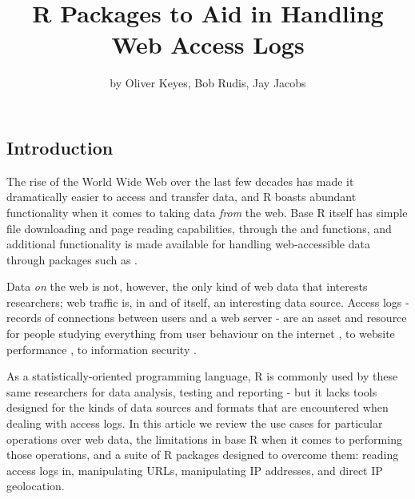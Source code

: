 \title{R Packages to Aid in Handling Web Access Logs}
\author{by Oliver Keyes, Bob Rudis, Jay Jacobs}

\maketitle


\subsection{Introduction}\label{introduction}

The rise of the World Wide Web over the last few decades has made it
dramatically easier to access and transfer data, and R \citep{RCore}
boasts abundant functionality when it comes to taking data \emph{from}
the web. Base R itself has simple file downloading and page reading
capabilities, through the  and 
functions, and additional functionality is made available for handling
web-accessible data through packages such as 
\citep{httr}.

Data \emph{on} the web is not, however, the only kind of web data that
interests researchers; web traffic is, in and of itself, an interesting
data source. Access logs - records of connections between users and a
web server - are an asset and resource for people studying everything
from user behaviour on the internet \citep{halfak}, to website
performance \citep{performance}, to information security
\citep{infosec}.

As a statistically-oriented programming language, R is commonly used by
these same researchers for data analysis, testing and reporting - but it
lacks tools designed for the kinds of data sources and formats that are
encountered when dealing with access logs. In this article we review the
use cases for particular operations over web data, the limitations in
base R when it comes to performing those operations, and a suite of R
packages designed to overcome them: reading access logs in, manipulating
URLs, manipulating IP addresses, and direct IP geolocation.

